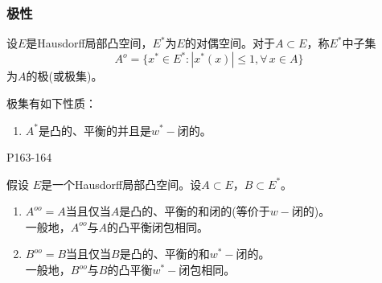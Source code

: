 \begin{example}[缓增广义函数]
	
\end{example}

\subsubsection{极性}

\begin{definition}
	设$E$是Hausdorff局部凸空间，$E^{*}$为$E$的对偶空间。对于$A\subset E$，称$E^{*}$中子集
	\begin{equation*}
		A^{o}=\{ x^{*} \in E^{*} : |x^{*}(x) |\leq 1, \forall \, x\in A \}
	\end{equation*}
	为$A$的极(或极集)。
\end{definition}

\original
{	\par
	极集有如下性质：
	\begin{enumerate}
		\item $A^{*}$是凸的、平衡的并且是$w^{*}-$闭的。
	\end{enumerate}
}
{P163-164}


\begin{theorem}[双极定理]
	假设 $E$是一个Hausdorff局部凸空间。设$A\subset E $，$B \subset E^{*} $。
	\begin{enumerate}
		\item $ A^{oo} = A $当且仅当$ A $是凸的、平衡的和闭的(等价于$w-$闭的)。
		\\一般地，$A^{oo}$与$A$的凸平衡闭包相同。
		\item $B^{oo} = B $当且仅当$B$是凸的、平衡的和$w^{*}-$闭的。\\
		一般地，$B^{oo}$与$B$的凸平衡$w^{*}-$闭包相同。
	\end{enumerate}
\end{theorem}













